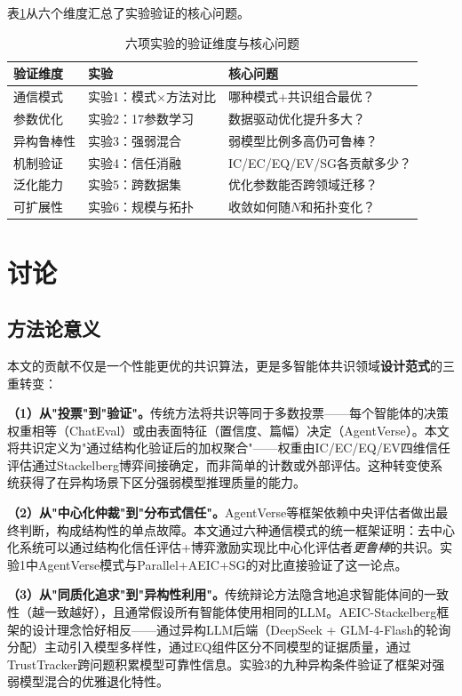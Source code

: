 \documentclass[12pt,a4paper,UTF8,fontset=fandol]{ctexart}
\begin{document}
表\ref{tab:summary}从六个维度汇总了实验验证的核心问题。

\begin{table}[H]
\centering
\caption{六项实验的验证维度与核心问题}\label{tab:summary}
\begin{tabular}{lll}
\toprule
验证维度 & 实验 & 核心问题 \\
\midrule
通信模式 & 实验1：模式$\times$方法对比 & 哪种模式+共识组合最优？ \\
参数优化 & 实验2：17参数学习 & 数据驱动优化提升多大？ \\
异构鲁棒性 & 实验3：强弱混合 & 弱模型比例多高仍可鲁棒？ \\
机制验证 & 实验4：信任消融 & IC/EC/EQ/EV/SG各贡献多少？ \\
泛化能力 & 实验5：跨数据集 & 优化参数能否跨领域迁移？ \\
可扩展性 & 实验6：规模与拓扑 & 收敛如何随$N$和拓扑变化？ \\
\bottomrule
\end{tabular}
\end{table}

\section{讨论}\label{sec:discussion}

\subsection{方法论意义}

本文的贡献不仅是一个性能更优的共识算法，更是多智能体共识领域\textbf{设计范式}的三重转变：

\textbf{（1）从"投票"到"验证"。}传统方法将共识等同于多数投票——每个智能体的决策权重相等（ChatEval）或由表面特征（置信度、篇幅）决定（AgentVerse）。本文将共识定义为"通过结构化验证后的加权聚合"——权重由IC/EC/EQ/EV四维信任评估通过Stackelberg博弈间接确定，而非简单的计数或外部评估。这种转变使系统获得了在异构场景下区分强弱模型推理质量的能力。

\textbf{（2）从"中心化仲裁"到"分布式信任"。}AgentVerse等框架依赖中央评估者做出最终判断，构成结构性的单点故障。本文通过六种通信模式的统一框架证明：去中心化系统可以通过结构化信任评估+博弈激励实现比中心化评估者\textit{更鲁棒}的共识。实验1中AgentVerse模式与Parallel+AEIC+SG的对比直接验证了这一论点。

\textbf{（3）从"同质化追求"到"异构性利用"。}传统辩论方法隐含地追求智能体间的一致性（越一致越好），且通常假设所有智能体使用相同的LLM。AEIC-Stackelberg框架的设计理念恰好相反——通过异构LLM后端（DeepSeek + GLM-4-Flash的轮询分配）主动引入模型多样性，通过EQ组件区分不同模型的证据质量，通过TrustTracker跨问题积累模型可靠性信息。实验3的九种异构条件验证了框架对强弱模型混合的优雅退化特性。
\end{document}
